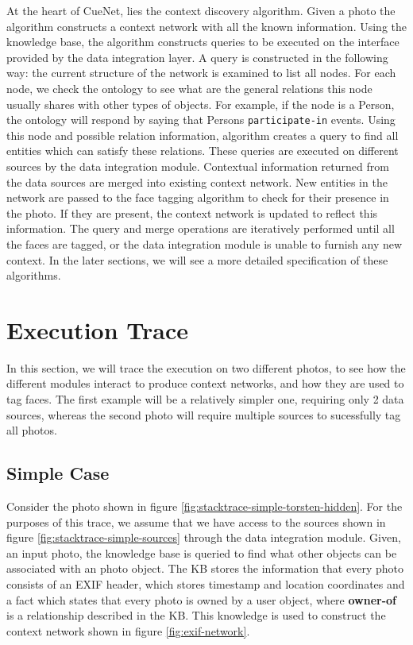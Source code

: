 At the heart of CueNet, lies the context discovery algorithm. Given a photo the algorithm constructs a context network with all the known information. Using the knowledge base, the algorithm constructs queries to be executed on the interface provided by the data integration layer. A query is constructed in the following way: the current structure of the network is examined to list all nodes. For each node, we check the ontology to see what are the general relations this node usually shares with other types of objects. For example, if the node is a Person, the ontology will respond by saying that Persons \texttt{participate-in} events. Using this node and possible relation information, algorithm creates a query to find all entities which can satisfy these relations. These queries are executed on different sources by the data integration module. Contextual information returned from the data sources are merged into existing context network. New entities in the network are passed to the face tagging algorithm to check for their presence in the photo. If they are present, the context network is updated to reflect this information. The query and merge operations are iteratively performed until all the faces are tagged, or the data integration module is unable to furnish any new context. In the later sections, we will see a more detailed specification of these algorithms.

\section{Execution Trace}
In this section, we will trace the execution on two different photos, to see how the different modules interact to produce context networks, and how they are used to tag faces. The first example will be a relatively simpler one, requiring only 2 data sources, whereas the second photo will require multiple sources to sucessfully tag all photos.

\subsection{Simple Case}

Consider the photo shown in figure \ref{fig:stacktrace-simple-torsten-hidden}. For the purposes of this trace, we assume that we have access to the sources shown in figure \ref{fig:stacktrace-simple-sources} through the data integration module. Given, an input photo, the knowledge base is queried to find what other objects can be associated with an photo object. The KB stores the information that every photo consists of an EXIF header, which stores timestamp and location coordinates and a fact which states that every photo is owned by a user object, where \textbf{owner-of} is a relationship described in the KB. This knowledge is used to construct the context network shown in figure \ref{fig:exif-network}.

